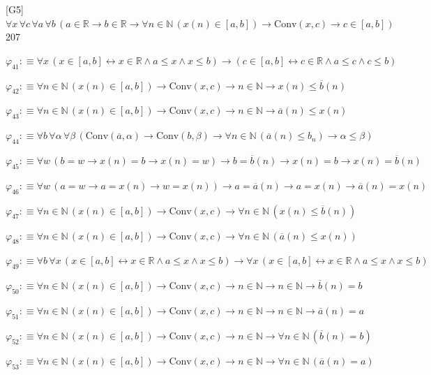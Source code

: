 \begin{fullproof}{[G5]}{$\forall x\,\forall c\,\forall a\,\forall b\,(a \in \mathbb{R} \to b \in \mathbb{R} \to \forall n \in \mathbb{N}\,(x(n) \in [a,b]) \to \mathrm{Conv}(x,c) \to c \in [a,b])$}{207}
\begin{abbrevlist}
\item $\varphi_{41} :\equiv \forall x\,(x \in [a,b] \leftrightarrow x \in \mathbb{R} \land a \leq x \land x \leq b) \to (c \in [a,b] \leftrightarrow c \in \mathbb{R} \land a \leq c \land c \leq b)$
\item $\varphi_{42} :\equiv \forall n \in \mathbb{N}\,(x(n) \in [a,b]) \to \mathrm{Conv}(x,c) \to n \in \mathbb{N} \to x(n) \leq \overline{b}(n)$
\item $\varphi_{43} :\equiv \forall n \in \mathbb{N}\,(x(n) \in [a,b]) \to \mathrm{Conv}(x,c) \to n \in \mathbb{N} \to \overline{a}(n) \leq x(n)$
\item $\varphi_{44} :\equiv \forall b\,\forall \alpha\,\forall \beta\,(\mathrm{Conv}(\overline{a},\alpha) \to \mathrm{Conv}(b,\beta) \to \forall n \in \mathbb{N}\,(\overline{a}(n) \leq b_{n}) \to \alpha \leq \beta)$
\item $\varphi_{45} :\equiv \forall w\,(b = w \to x(n) = b \to x(n) = w) \to b = \overline{b}(n) \to x(n) = b \to x(n) = \overline{b}(n)$
\item $\varphi_{46} :\equiv \forall w\,(a = w \to a = x(n) \to w = x(n)) \to a = \overline{a}(n) \to a = x(n) \to \overline{a}(n) = x(n)$
\item $\varphi_{47} :\equiv \forall n \in \mathbb{N}\,(x(n) \in [a,b]) \to \mathrm{Conv}(x,c) \to \forall n \in \mathbb{N}\,(x(n) \leq \overline{b}(n))$
\item $\varphi_{48} :\equiv \forall n \in \mathbb{N}\,(x(n) \in [a,b]) \to \mathrm{Conv}(x,c) \to \forall n \in \mathbb{N}\,(\overline{a}(n) \leq x(n))$
\item $\varphi_{49} :\equiv \forall b\,\forall x\,(x \in [a,b] \leftrightarrow x \in \mathbb{R} \land a \leq x \land x \leq b) \to \forall x\,(x \in [a,b] \leftrightarrow x \in \mathbb{R} \land a \leq x \land x \leq b)$
\item $\varphi_{50} :\equiv \forall n \in \mathbb{N}\,(x(n) \in [a,b]) \to \mathrm{Conv}(x,c) \to n \in \mathbb{N} \to n \in \mathbb{N} \to \overline{b}(n) = b$
\item $\varphi_{51} :\equiv \forall n \in \mathbb{N}\,(x(n) \in [a,b]) \to \mathrm{Conv}(x,c) \to n \in \mathbb{N} \to n \in \mathbb{N} \to \overline{a}(n) = a$
\item $\varphi_{52} :\equiv \forall n \in \mathbb{N}\,(x(n) \in [a,b]) \to \mathrm{Conv}(x,c) \to n \in \mathbb{N} \to \forall n \in \mathbb{N}\,(\overline{b}(n) = b)$
\item $\varphi_{53} :\equiv \forall n \in \mathbb{N}\,(x(n) \in [a,b]) \to \mathrm{Conv}(x,c) \to n \in \mathbb{N} \to \forall n \in \mathbb{N}\,(\overline{a}(n) = a)$

\end{abbrevlist}
\end{fullproof}
